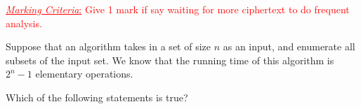 \documentclass[addpoints,12pt]{exam}
\newcommand{\mycorrectchoice}[1]{\CorrectChoice \fbox{#1}}
\newcommand{\mycorrectchoice}[1]{\CorrectChoice #1}
\newcommand{\Exp}[1]{\textcolor{blue}{\underline{\emph{Explanation}:} #1}}
\newcommand{\MC}[1]{\textcolor{red}{\underline{\emph{Marking Criteria}:} #1}}
\begin{document}
{\begin{questions}
\begin{solution}
         \MC{Give 1 mark if say waiting for more ciphertext to do frequent analysis.}
    \end{solution}

     \vspace{20pt}

    \question Suppose that an algorithm takes in a set of size $n$ as an input, and enumerate all subsets of the input set. We know that the running time of this algorithm is $2^n-1$ elementary operations.
    \vspace{10pt}

    \vspace{20pt}
    
    \question[1] Which of the following statements is true?\\


\end{questions}}
\end{document}

